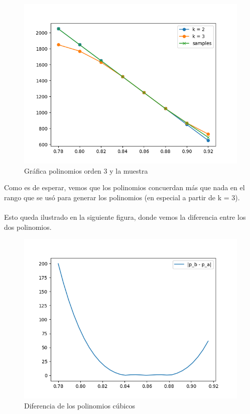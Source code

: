\begin{figure}[H]
	\includegraphics[width=\linewidth]{figures/figure2.png}
	\caption{Gráfica polinomios orden 3 y la muestra}
	\label{fig:interp_cub}
\end{figure}

Como es de esperar, vemos que los polinomios concuerdan más que nada en el rango que se usó para generar los polinomios (en especial a partir de k = 3).

\newpage 
\paragraph{} 
Esto queda ilustrado en la siguiente figura, donde vemos la diferencia entre los dos polinomios. 

\begin{figure}[H]
	\includegraphics[width=\linewidth]{figures/figure3.png}
	\caption{Diferencia de los polinomios cúbicos}
	\label{fig:diff_interp_cub}
\end{figure}


